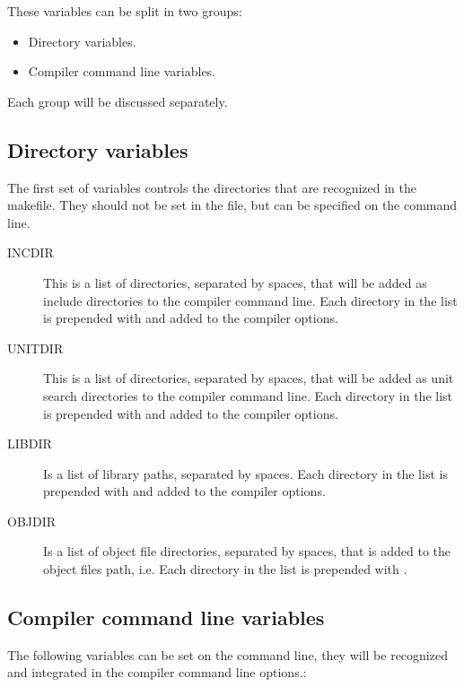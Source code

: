These variables can be split in two groups:
\begin{itemize}
\item Directory variables.
\item Compiler command line variables.
\end{itemize}
Each group will be discussed separately.

\subsection{Directory variables}

The first set of variables controls the directories that are
recognized in the makefile. They should not be set in the
 file, but can be specified on the command line.
\begin{description}
\item[INCDIR] This is a list of directories, separated by spaces, that will
be added as include directories to the compiler command line.  Each
directory in the list is prepended with  and added to the
compiler options.
\item[UNITDIR] This is a list of directories, separated by spaces, that will
be added as unit search directories to the compiler command line.  Each
directory in the list is prepended with  and added to the
compiler options.
\item[LIBDIR] Is a list of library paths, separated by spaces. Each
directory in the list is prepended with  and added to the
compiler options.
\item[OBJDIR] Is a list of object file directories, separated by spaces, that is
added to the object files path, i.e. Each directory in the list is prepended with
.
\end{description}

\subsection{Compiler command line variables }
The following variables can be set on the  command line,
they will be recognized and integrated in the compiler command line options.:

